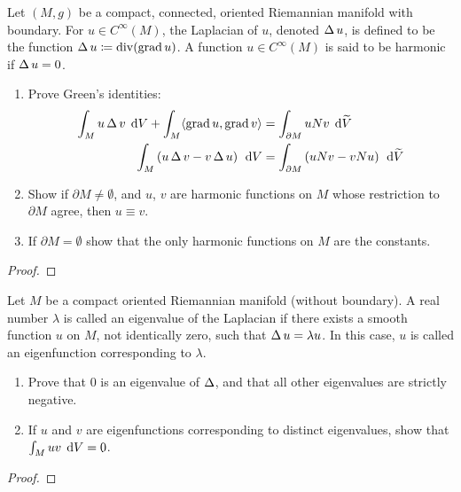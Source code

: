 \begin{problem}
Let $(M,g)$ be a compact, connected, oriented Riemannian manifold with
boundary. For $u\in C^\infty(M)$, the Laplacian of $u$, denoted $\operatorname{\Delta} u$,
is defined to be the function $\operatorname{\Delta} u\coloneqq \operatorname{div}(\operatorname{grad} u)$. A function
$u\in C^\infty(M)$ is said to be harmonic if $\operatorname{\Delta} u=0$.
\begin{enumerate}[label=(\alph*)]
\item Prove Green's identities:
\begin{align*}
\int_M u\operatorname{\Delta} v\,\;\mathrm{d} V+\int_M\langle\operatorname{grad} u,\operatorname{grad} v\rangle
&=\int_{\partial M}uNv\,\;\mathrm{d}\widetilde V\\
\int_M\left(u\operatorname{\Delta} v-v\operatorname{\Delta} u\right)\,\;\mathrm{d} V
&=\int_{\partial M}\left(uNv-vNu\right)\,\;\mathrm{d}\widetilde V
\end{align*}
\item Show if $\partial M\neq\emptyset$, and $u$, $v$ are harmonic
  functions on $M$ whose restriction to $\partial M$ agree, then $u\equiv
  v$.
\item If $\partial M=\emptyset$ show that the only harmonic functions on
  $M$ are the constants.
\end{enumerate}
\end{problem}
\begin{proof}
\end{proof}
\newpage

\begin{problem}
Let $M$ be a compact oriented Riemannian manifold (without boundary). A
real number $\lambda$ is called an eigenvalue of the Laplacian if
there exists a smooth function $u$ on $M$, not identically zero, such
that $\operatorname{\Delta} u=\lambda u$. In this case, $u$ is called an eigenfunction
corresponding to $\lambda$.
\begin{enumerate}[label=(\alph*)]
\item Prove that $0$ is an eigenvalue of $\operatorname{\Delta}$, and that all other
  eigenvalues are strictly negative.
\item If $u$ and $v$ are eigenfunctions corresponding to distinct
  eigenvalues, show that $\int_M uv\,\;\mathrm{d} V=0$.
\end{enumerate}
\end{problem}
\begin{proof}
\end{proof}


